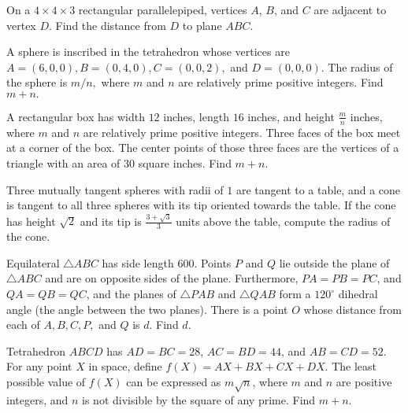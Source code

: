 \documentclass{article}
\begin{document}
\begin{prob}[AHSME 1996/28]{4}
On a $4\times 4\times 3$ rectangular parallelepiped, vertices $A$, $B$, and $C$ are adjacent to vertex $D$. Find the distance from $D$ to plane $ABC$.
\end{prob}

\begin{prob}[AIME I 2001/12]{6}
A sphere is inscribed in the tetrahedron whose vertices are $A = (6,0,0), B = (0,4,0), C = (0,0,2),$ and $D = (0,0,0).$ The radius of the sphere is $m/n,$ where $m$ and $n$ are relatively prime positive integers. Find $m + n.$
\end{prob}

\begin{prob}[AIME I 2013/7]{6}
A rectangular box has width $12$ inches, length $16$ inches, and height $\frac{m}{n}$ inches, where $m$ and $n$ are relatively prime positive integers. Three faces of the box meet at a corner of the box. The center points of those three faces are the vertices of a triangle with an area of $30$ square inches. Find $m+n$.
\end{prob}

\begin{req}[NARML 10]{9}
Three mutually tangent spheres with radii of $1$ are tangent to a table, and a cone is tangent to all three spheres with its tip oriented towards the table. If the cone has height $\sqrt{2}$ and its tip is $\tfrac{3+\sqrt{3}}{3}$ units above the table, compute the radius of the cone.
\end{req}

\begin{prob}[AIME II 2016/14]{13}
Equilateral $\triangle ABC$ has side length $600$. Points $P$ and $Q$ lie outside the plane of $\triangle ABC$ and are on opposite sides of the plane. Furthermore, $PA=PB=PC$, and $QA=QB=QC$, and the planes of $\triangle PAB$ and $\triangle QAB$ form a $120^{\circ}$ dihedral angle (the angle between the two planes). There is a point $O$ whose distance from each of $A,B,C,P,$ and $Q$ is $d$. Find $d$.
\end{prob}

\begin{prob}[AIME II 2017/15]{13}
Tetrahedron $ABCD$ has $AD=BC=28$, $AC=BD=44$, and $AB=CD=52$. For any point $X$ in space, define $f(X)=AX+BX+CX+DX$. The least possible value of $f(X)$ can be expressed as $m\sqrt{n}$, where $m$ and $n$ are positive integers, and $n$ is not divisible by the square of any prime. Find $m+n$.
\end{prob}
\end{document}
